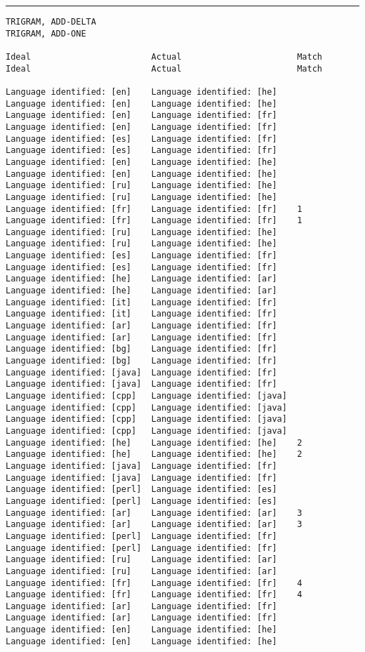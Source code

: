\tiny
\hrule\vskip4pt
\begin{verbatim}
TRIGRAM, ADD-DELTA                                                 TRIGRAM, ADD-ONE

Ideal                        Actual                       Match    Ideal                        Actual                       Match

Language identified: [en]    Language identified: [he]             Language identified: [en]    Language identified: [he]
Language identified: [en]    Language identified: [fr]             Language identified: [en]    Language identified: [fr]
Language identified: [es]    Language identified: [fr]             Language identified: [es]    Language identified: [fr]
Language identified: [en]    Language identified: [he]             Language identified: [en]    Language identified: [he]
Language identified: [ru]    Language identified: [he]             Language identified: [ru]    Language identified: [he]
Language identified: [fr]    Language identified: [fr]    1        Language identified: [fr]    Language identified: [fr]    1
Language identified: [ru]    Language identified: [he]             Language identified: [ru]    Language identified: [he]
Language identified: [es]    Language identified: [fr]             Language identified: [es]    Language identified: [fr]
Language identified: [he]    Language identified: [ar]             Language identified: [he]    Language identified: [ar]
Language identified: [it]    Language identified: [fr]             Language identified: [it]    Language identified: [fr]
Language identified: [ar]    Language identified: [fr]             Language identified: [ar]    Language identified: [fr]
Language identified: [bg]    Language identified: [fr]             Language identified: [bg]    Language identified: [fr]
Language identified: [java]  Language identified: [fr]             Language identified: [java]  Language identified: [fr]
Language identified: [cpp]   Language identified: [java]           Language identified: [cpp]   Language identified: [java]
Language identified: [cpp]   Language identified: [java]           Language identified: [cpp]   Language identified: [java]
Language identified: [he]    Language identified: [he]    2        Language identified: [he]    Language identified: [he]    2
Language identified: [java]  Language identified: [fr]             Language identified: [java]  Language identified: [fr]
Language identified: [perl]  Language identified: [es]             Language identified: [perl]  Language identified: [es]
Language identified: [ar]    Language identified: [ar]    3        Language identified: [ar]    Language identified: [ar]    3
Language identified: [perl]  Language identified: [fr]             Language identified: [perl]  Language identified: [fr]
Language identified: [ru]    Language identified: [ar]             Language identified: [ru]    Language identified: [ar]
Language identified: [fr]    Language identified: [fr]    4        Language identified: [fr]    Language identified: [fr]    4
Language identified: [ar]    Language identified: [fr]             Language identified: [ar]    Language identified: [fr]
Language identified: [en]    Language identified: [he]             Language identified: [en]    Language identified: [he]


\end{verbatim}
